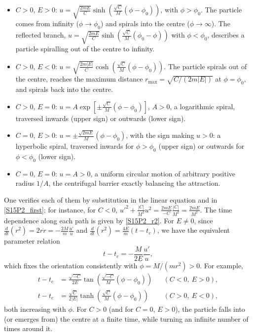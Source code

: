 \begin{problem}[title={Motion in an inverse-cube attractive force}]
{\begin{itemize}
    \item $C>0$, $E>0$: $u = \sqrt{\frac{2mE}{C}}\sinh{\left(\frac{\sqrt{C}}{M}(\phi-\phi_0)\right)}$, with $\phi>\phi_0$. The particle comes from infinity ($\phi\rightarrow\phi_0$) and spirals into the centre ($\phi\rightarrow\infty$). The reflected branch, $u = \sqrt{\frac{2mE}{C}}\sinh{\left(\frac{\sqrt{C}}{M}(\phi_0-\phi)\right)}$ with $\phi<\phi_0$, describes a particle spiralling out of the centre to infinity.
    \item $C>0$, $E<0$: $u = \sqrt{\frac{2m|E|}{C}}\cosh{\left(\frac{\sqrt{C}}{M}(\phi-\phi_0)\right)}$. The particle spirals out of the centre, reaches the maximum distance $r_{\text{max}} = \sqrt{C/(2m|E|)}$ at $\phi = \phi_0$, and spirals back into the centre.
    \item $C>0$, $E=0$: $u = A\exp{\left[\pm\frac{\sqrt{C}}{M}(\phi-\phi_0)\right]}$, $A>0$, a logarithmic spiral, traversed inwards (upper sign) or outwards (lower sign).
    \item $C=0$, $E>0$: $u = \pm\frac{\sqrt{2mE}}{M}(\phi-\phi_0)$, with the sign making $u>0$: a hyperbolic spiral, traversed inwards for $\phi>\phi_0$ (upper sign) or outwards for $\phi<\phi_0$ (lower sign).
    \item $C=0$, $E=0$: $u = A>0$, a uniform circular motion of arbitrary positive radius $1/A$, the centrifugal barrier exactly balancing the attraction.
\end{itemize}
One verifies each of them by substitution in the linear equation and in \eqref{S15P2_first}; for instance, for $C<0$, $u'^2 + \frac{|C|}{M^2}u^2 = \frac{2mE}{-C}\frac{|C|}{M^2} = \frac{2mE}{M^2}$. The time dependence along each path is given by \eqref{S15P2_r2}. For $E\neq0$, since $\frac{d}{dt}\left(r^2\right) = 2r\Dot{r} = -\frac{2M}{m}\frac{u'}{u}$ and $\frac{d}{dt}\left(r^2\right) = \frac{4E}{m}(t-t_c)$, we have the equivalent parameter relation
\begin{equation*}
    t - t_c = -\frac{M}{2E}\frac{u'}{u},
\end{equation*}
which fixes the orientation consistently with $\Dot{\phi} = M/(mr^2) > 0$. For example,
\begin{align*}
    t - t_c &= \frac{\sqrt{-C}}{2E}\tan{\left(\frac{\sqrt{-C}}{M}(\phi-\phi_0)\right)} & &(C<0,\ E>0), \\
    t - t_c &= \frac{\sqrt{C}}{2|E|}\tanh{\left(\frac{\sqrt{C}}{M}(\phi-\phi_0)\right)} & &(C>0,\ E<0),
\end{align*}
both increasing with $\phi$. For $C>0$ (and for $C=0$, $E>0$), the particle falls into (or emerges from) the centre at a finite time, while turning an infinite number of times around it.

}
\end{problem}
